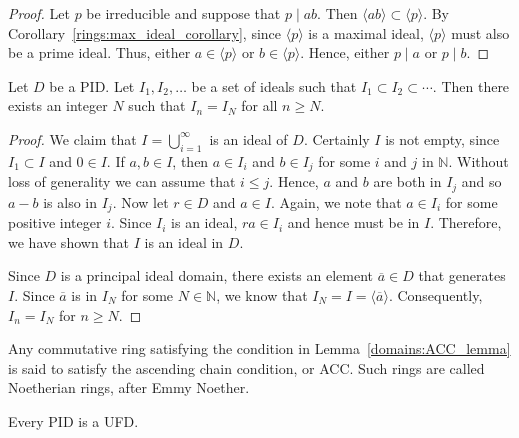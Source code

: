 \begin{proof}
Let $p$ be irreducible and suppose that $p \mid ab$.  Then $\langle
ab \rangle \subset \langle p \rangle$. By Corollary~\ref{rings:max_ideal_corollary}, since
$\langle p \rangle$ is a maximal ideal, $\langle p \rangle$ must also
be a prime ideal. Thus, either $a \in \langle p \rangle$ or $b \in
\langle p \rangle$.  Hence, either $p \mid a $ or $p \mid b$. 
\end{proof}


\begin{lemma}\label{domains:ACC_lemma}
Let $D$ be a PID.  Let $I_1, I_2, \ldots$ be a set of ideals such that 
$I_1 \subset I_2 \subset \cdots$. Then there exists an integer $N$
such that $I_n = I_N$ for all $n \geq N$.
\end{lemma}
 

\begin{proof}
We claim that $I= \bigcup_{i=1}^\infty$ is an ideal of $D$. Certainly
$I$ is not empty, since $I_1 \subset I$ and $0 \in I$. If $a, b \in I$,
then $a \in I_i$ and $b \in I_j$ for some $i$ and $j$ in ${\mathbb N}$.
Without loss of generality we can assume that $i \leq j$.  Hence, $a$
and $b$ are both in $I_j$ and so $a - b$ is also in $I_j$. Now let $r
\in D$ and $a \in I$. Again, we note that $a \in I_i$ for some
positive integer $i$.  Since $I_i$ is an ideal, $ra \in I_i$ and hence
must be in $I$. Therefore, we have shown that $I$ is an ideal in $D$.


Since $D$ is a principal ideal domain, there exists an element 
$\overline{a} \in D$ that generates $I$. Since $\overline{a}$ is in 
$I_N$ for some $N \in {\mathbb N}$, we know that $I_N = I = \langle 
\overline{a} \rangle$. Consequently, $I_n = I_N$ for $n \geq N$.
\end{proof}		    
 

\medskip


Any commutative ring satisfying the condition in Lemma~\ref{domains:ACC_lemma} is said
to satisfy the {\bfi ascending chain condition}, or {\bfi ACC}.  Such rings are called {\bfi
Noetherian rings}, after Emmy Noether.  


\begin{theorem}
Every PID is a UFD.
\end{theorem}
 

